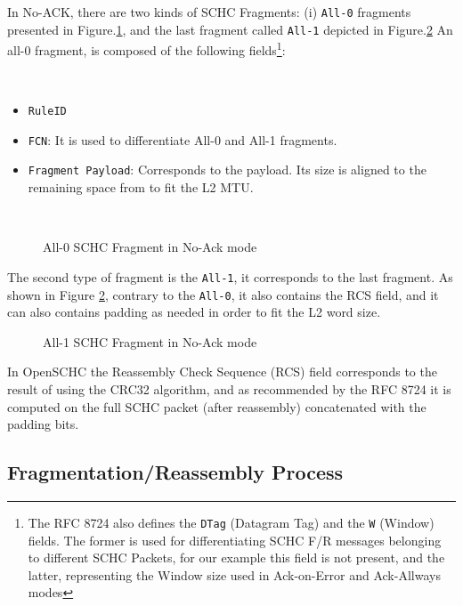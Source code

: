 \documentclass[onecolumn,12pt]{book}
\newcounter{c}
\begin{document}
In No-ACK, there are two kinds of SCHC Fragments: (i) \texttt{All-0} fragments presented in Figure.\ref{fig:all-0}, and the last fragment called \texttt{All-1} depicted in Figure.\ref{fig:all-1}
An all-0 fragment, is composed of the following fields\footnote{The RFC 8724 also defines the \texttt{DTag} (Datagram Tag) and the \texttt{W} (Window) fields. The former is used for differentiating SCHC F/R messages belonging to different SCHC Packets, for our example this field is not present, and the latter, representing the Window size used in Ack-on-Error and Ack-Allways modes}:

~

\begin{itemize}
    \item \texttt{RuleID}
    \item \texttt{FCN}: It is used to differentiate All-0 and All-1 fragments. 
    \item \texttt{Fragment Payload}: Corresponds to the payload. Its size is aligned to the remaining space from to fit the L2 MTU.
\end{itemize}

~

\begin{figure}[!ht] 
    \centering 
    
    \caption{All-0 SCHC Fragment in No-Ack mode} 
    \label{fig:all-0} 
\end{figure} 

The second type of fragment is the \texttt{All-1}, it corresponds to the last fragment. As shown in Figure \ref{fig:all-1}, contrary to the \texttt{All-0}, it also contains the RCS field, and it can also contains padding as needed in order to fit the L2 word size.

\begin{figure}[!ht] 
    \centering 
    
    \caption{All-1 SCHC Fragment in No-Ack mode} 
    \label{fig:all-1} 
\end{figure} 
   
In OpenSCHC the Reassembly Check Sequence (RCS) field corresponds to the result of using the CRC32 algorithm, and as recommended by the RFC 8724 it is computed on the full SCHC packet (after reassembly) concatenated with the padding bits.

\subsection{Fragmentation/Reassembly Process}
\end{document}
